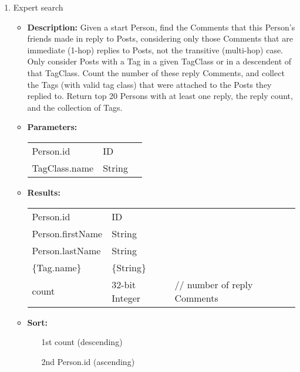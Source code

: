 {\begin{enumerate}
    \item Expert search
        \begin{itemize}
            \item \textbf{Description:}
                Given a start Person, find the Comments that this Person's
                friends made in reply to Posts, considering only those Comments
                that are immediate (1-hop) replies to Posts, not the transitive
                (multi-hop) case.  Only consider Posts with a Tag in a given
                TagClass or in a descendent of that TagClass.  Count the number
                of these reply Comments, and collect the Tags (with valid tag
                class) that were attached to the Posts they replied to.  Return
                top 20 Persons with at least one reply, the reply count, and
                the collection of Tags.  
            \item \textbf{Parameters:} \\
                \begin{tabular}{lll}
                    Person.id 	 					& ID & \parbox[t]{20cm}{\par \strut} \\
                    TagClass.name	 				& String & \parbox[t]{20cm}{\par \strut} \\
                \end{tabular}		
            \item \textbf{Results:} \\
                \begin{tabular}{lll}
                    Person.id 	 			& ID & \parbox[t]{20cm}{\par \strut} \\
                    Person.firstName 	 	& String & \parbox[t]{20cm}{\par \strut} \\
                    Person.lastName 	 	& String & \parbox[t]{20cm}{\par \strut} \\
                    \{Tag.name\} 	 			& \{String\} & \parbox[t]{20cm}{\par \strut} \\
                    count 	 				& 32-bit Integer & \parbox[t]{20cm}{// number of reply Comments\par \strut} \\
                \end{tabular}		
            \item \textbf{Sort:}
                  \begin{itemize}
                    \item[1st] count (descending)
                    \item[2nd] Person.id (ascending)
                  \end{itemize}
        \end{itemize}


\end{enumerate}}
